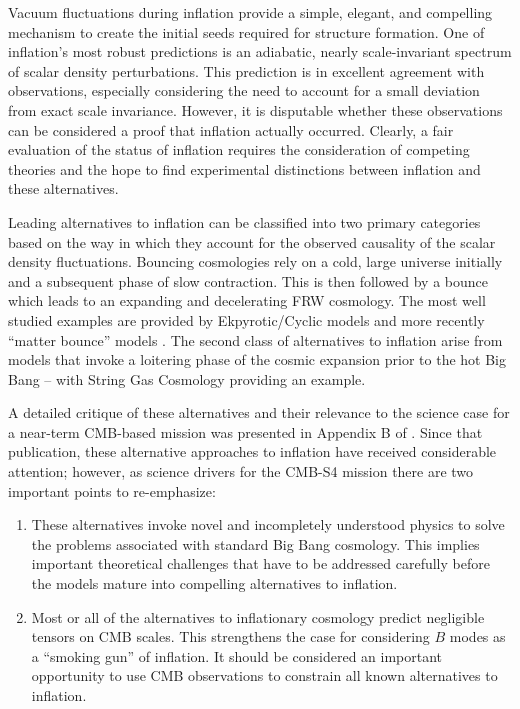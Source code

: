 Vacuum fluctuations during inflation provide a simple, elegant, and compelling mechanism to create the initial seeds required for structure formation. 
One of inflation's most robust predictions is an adiabatic, nearly
scale-invariant spectrum of scalar density perturbations.
This prediction is in excellent agreement with observations, especially considering
the need to account for a small deviation from
exact scale invariance.
However, it is disputable whether these observations can be considered a
proof that inflation actually occurred.
Clearly, a fair evaluation of the status of inflation requires the
consideration of competing theories and the hope to find experimental distinctions between inflation and these alternatives.

Leading alternatives to inflation can be classified into two primary categories based on the 
way in which they account for the observed causality of the scalar density fluctuations.
Bouncing cosmologies rely on a cold, large universe initially and a subsequent phase of
slow contraction. This is then followed by a bounce which leads
to an expanding and decelerating FRW cosmology.  The most well studied examples are provided by 
Ekpyrotic/Cyclic models \cite{Khoury:2001bz,Khoury:2001wf}
and more recently ``matter bounce'' models \cite{Brandenberger:2012zb,Cai:2014jla,deHaro:2015wda}.
The second class of alternatives to inflation arise from models that invoke a loitering phase of the cosmic expansion prior to the hot Big Bang -- with 
String Gas Cosmology \cite{Brandenberger:1988aj,Tseytlin:1991xk,Battefeld:2005av} providing an example. 

 A detailed critique of these alternatives and their relevance to the science case for a
near-term CMB-based mission was presented in Appendix B of \cite{Baumann:2008aq}.  
Since that publication, these alternative approaches to inflation have received considerable attention; 
however, as science drivers for the CMB-S4 mission there are two important points to re-emphasize:
\begin{enumerate}
\item These alternatives invoke novel and incompletely understood physics to solve the problems associated with standard Big Bang cosmology.  This implies important theoretical challenges that have to be addressed carefully before the models mature into compelling alternatives to inflation.

\item Most or all of the alternatives to inflationary cosmology predict negligible tensors on CMB scales.
This strengthens the case for considering $B$ modes as a ``smoking gun'' of inflation.  It should be considered an important
opportunity to use CMB observations to constrain all known alternatives to inflation.
\end{enumerate}

